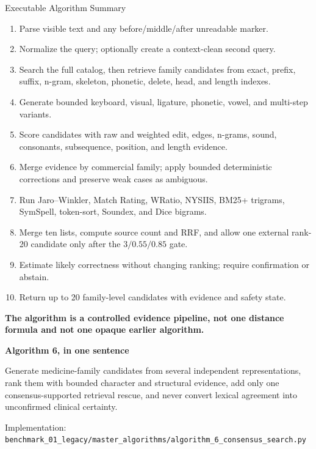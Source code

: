 \documentclass[aspectratio=169,10pt]{beamer}
\newcommand{\code}[1]{\texttt{#1}}
\newcommand{\good}[1]{\textcolor{A6Green}{\textbf{#1}}}
\begin{document}
\begin{frame}{Executable Algorithm Summary}
\footnotesize
\begin{enumerate}
  \item Parse visible text and any before/middle/after unreadable marker.
  \item Normalize the query; optionally create a context-clean second query.
  \item Search the full catalog, then retrieve family candidates from exact,
        prefix, suffix, n-gram, skeleton, phonetic, delete, head, and length indexes.
  \item Generate bounded keyboard, visual, ligature, phonetic, vowel, and
        multi-step variants.
  \item Score candidates with raw and weighted edit, edges, n-grams, sound,
        consonants, subsequence, position, and length evidence.
  \item Merge evidence by commercial family; apply bounded deterministic
        corrections and preserve weak cases as ambiguous.
  \item Run Jaro--Winkler, Match Rating, WRatio, NYSIIS, BM25+ trigrams,
        SymSpell, token-sort, Soundex, and Dice bigrams.
  \item Merge ten lists, compute source count and RRF, and allow one external
        rank-20 candidate only after the $3/0.55/0.85$ gate.
  \item Estimate likely correctness without changing ranking; require
        confirmation or abstain.
  \item Return up to 20 family-level candidates with evidence and safety state.
\end{enumerate}

\vspace{2mm}
\begin{center}
\good{The algorithm is a controlled evidence pipeline, not one distance formula
and not one opaque earlier algorithm.}
\end{center}
\end{frame}

\begin{frame}[plain]
\centering
\vfill
{\LARGE\bfseries Algorithm 6, in one sentence}

\vspace{8mm}
\begin{minipage}{0.82\linewidth}
\centering
\large
Generate medicine-family candidates from several independent representations,
rank them with bounded character and structural evidence, add only one
consensus-supported retrieval rescue, and never convert lexical agreement into
unconfirmed clinical certainty.
\end{minipage}

\vfill
\small
Implementation: \code{benchmark\_01\_legacy/master\_algorithms/algorithm\_6\_consensus\_search.py}
\end{frame}
\end{document}
